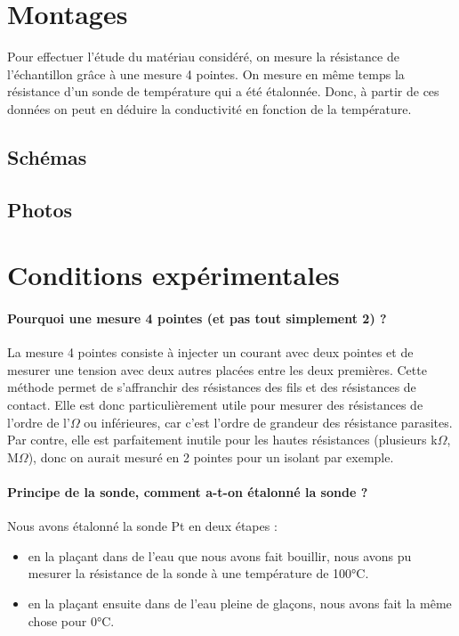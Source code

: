 \section*{Montages}
Pour effectuer l'étude du matériau considéré, on mesure la résistance de l'échantillon grâce à une mesure 4 pointes.
On mesure en même temps la résistance d'un sonde de température qui a été étalonnée.
Donc, à partir de ces données on peut en déduire la conductivité en fonction de la température.

\subsection*{Schémas}

\subsection*{Photos}


\section*{Conditions expérimentales}
\paragraph*{Pourquoi une mesure 4 pointes (et pas tout simplement 2) ?}
La mesure 4 pointes consiste à injecter un courant avec deux pointes et de mesurer une tension avec deux autres placées entre les deux premières.
Cette méthode permet de s'affranchir des résistances des fils et des résistances de contact.
Elle est donc particulièrement utile pour mesurer des résistances de l'ordre de l'$\Omega$ ou inférieures, car c'est l'ordre de grandeur des résistance parasites.
Par contre, elle est parfaitement inutile pour les hautes résistances (plusieurs k$\Omega$, M$\Omega$), donc on aurait mesuré en 2 pointes pour un isolant par exemple.

\paragraph*{Principe de la sonde, comment a-t-on étalonné la sonde ?}
Nous avons étalonné la sonde Pt en deux étapes :

\begin{itemize}
  \item en la plaçant dans de l'eau que nous avons fait bouillir, nous avons pu mesurer la résistance de la sonde à une température de 100°C.
  \item en la plaçant ensuite dans de l'eau pleine de glaçons, nous avons fait la même chose pour 0°C.
\end{itemize}

